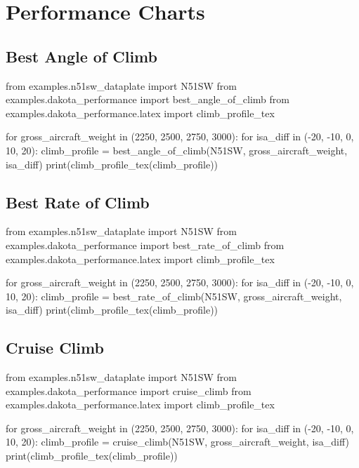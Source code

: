 \section{Performance Charts}

\pagebreak

\subsection{Best Angle of Climb}

\begin{pycode}
from examples.n51sw_dataplate import N51SW
from examples.dakota_performance import best_angle_of_climb
from examples.dakota_performance.latex import climb_profile_tex

for gross_aircraft_weight in (2250, 2500, 2750, 3000):
    for isa_diff in (-20, -10, 0, 10, 20):
        climb_profile = best_angle_of_climb(N51SW, gross_aircraft_weight, isa_diff)
        print(climb_profile_tex(climb_profile))
\end{pycode}

\subsection{Best Rate of Climb}

\begin{pycode}
from examples.n51sw_dataplate import N51SW
from examples.dakota_performance import best_rate_of_climb
from examples.dakota_performance.latex import climb_profile_tex

for gross_aircraft_weight in (2250, 2500, 2750, 3000):
    for isa_diff in (-20, -10, 0, 10, 20):
        climb_profile = best_rate_of_climb(N51SW, gross_aircraft_weight, isa_diff)
        print(climb_profile_tex(climb_profile))
\end{pycode}

\subsection{Cruise Climb}

\begin{pycode}
from examples.n51sw_dataplate import N51SW
from examples.dakota_performance import cruise_climb
from examples.dakota_performance.latex import climb_profile_tex

for gross_aircraft_weight in (2250, 2500, 2750, 3000):
    for isa_diff in (-20, -10, 0, 10, 20):
        climb_profile = cruise_climb(N51SW, gross_aircraft_weight, isa_diff)
        print(climb_profile_tex(climb_profile))
\end{pycode}


